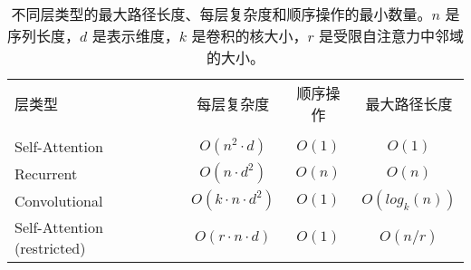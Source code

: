 \begin{table}[t]
\caption{
  不同层类型的最大路径长度、每层复杂度和顺序操作的最小数量。$n$ 是序列长度，$d$ 是表示维度，$k$ 是卷积的核大小，$r$ 是受限自注意力中邻域的大小。}
\label{tab:op_complexities}
\begin{center}
\vspace{-1mm}

\begin{tabular}{lccc}
\toprule
层类型 & 每层复杂度 & 顺序操作 & 最大路径长度  \\
           &             &  &   \\
\hline
\rule{0pt}{2.0ex}Self-Attention & $O(n^2 \cdot d)$ & $O(1)$ & $O(1)$ \\
Recurrent & $O(n \cdot d^2)$ & $O(n)$ & $O(n)$ \\

Convolutional & $O(k \cdot n \cdot d^2)$ & $O(1)$ & $O(log_k(n))$ \\
Self-Attention (restricted)& $O(r \cdot n \cdot d)$ & $O(1)$ & $O(n/r)$ \\





\bottomrule
\end{tabular}
\end{center}
\end{table}


%

